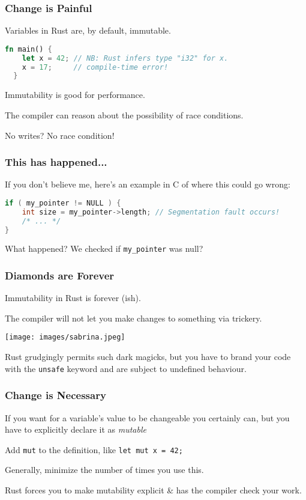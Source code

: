 \begin{frame}[fragile]
\frametitle{Change is Painful}

Variables in Rust are, by default, immutable.

\begin{lstlisting}[language=Rust]
  fn main() {
    let x = 42; // NB: Rust infers type "i32" for x.
    x = 17;     // compile-time error!
  }
\end{lstlisting}

Immutability is good for performance.

The compiler can reason about the possibility of race conditions.

No writes? No race condition!

\end{frame}


\begin{frame}[fragile]
\frametitle{This has happened...}

If you don't believe me, here's an example in C of where this could go wrong:
\begin{lstlisting}[language=C]
if ( my_pointer != NULL ) {
    int size = my_pointer->length; // Segmentation fault occurs!
    /* ... */
}
\end{lstlisting}

What happened? We checked if \texttt{my\_pointer} was null?

\end{frame}


\begin{frame}
\frametitle{Diamonds are Forever}

Immutability in Rust is forever (ish).

The compiler will not let you make changes to something via trickery.

\begin{center}
	\texttt{[image: images/sabrina.jpeg]}
\end{center}


Rust grudgingly permits such dark magicks, but you have to brand your code with the \texttt{unsafe} keyword and are subject to undefined behaviour.

\end{frame}


\begin{frame}
\frametitle{Change is Necessary}

If you want for a variable's value to be changeable you certainly can, but you have to explicitly declare it as \textit{mutable}

Add \texttt{mut} to the definition, like \texttt{let mut x = 42;}

Generally, minimize the number of times you use this.

Rust forces you to make mutability explicit \& has the compiler check your work.

\end{frame}


